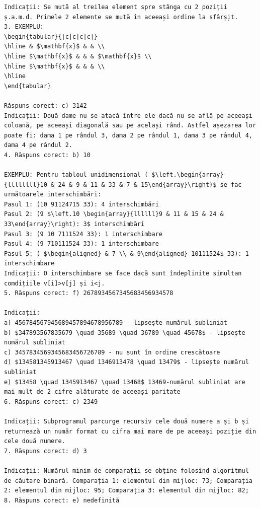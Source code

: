 \documentclass[10pt]{article}
\begin{document}
\begin{verbatim}
Indicații: Se mută al treilea element spre stânga cu 2 poziții ș.a.m.d. Primele 2 elemente se mută în aceeași ordine la sfârș̦it.
3. EXEMPLU:
\begin{tabular}{|c|c|c|c|}
\hline & $\mathbf{x}$ & & \\
\hline $\mathbf{x}$ & & & $\mathbf{x}$ \\
\hline $\mathbf{x}$ & & & \\
\hline
\end{tabular}

Răspuns corect: c) 3142
Indicații: Două dame nu se atacă între ele dacă nu se află pe aceeași coloană, pe aceeași diagonală sau pe același rând. Astfel așezarea lor poate fi: dama 1 pe rândul 3, dama 2 pe rândul 1, dama 3 pe rândul 4, dama 4 pe rândul 2.
4. Răspuns corect: b) 10

EXEMPLU: Pentru tabloul unidimensional ( $\left.\begin{array}{llllllll}10 & 24 & 9 & 11 & 33 & 7 & 15\end{array}\right)$ se fac următoarele interschimbări:
Pasul 1: (10 91124715 33): 4 interschimbări
Pasul 2: (9 $\left.10 \begin{array}{llllll}9 & 11 & 15 & 24 & 33\end{array}\right): 3$ interschimbări
Pasul 3: (9 10 7111524 33): 1 interschimbare
Pasul 4: (9 710111524 33): 1 interschimbare
Pasul 5: ( $\begin{aligned} & 7 \\ & 9\end{aligned} 10111524$ 33): 1 interschimbare
Indicații: O interschimbare se face dacă sunt îndeplinite simultan comdițiile v[i]>v[j] și i<j.
5. Răspuns corect: f) 2678934567345683456934578

Indicații:
a) 456784567945689457894678956789 - lipsește numărul subliniat
b) $347893567835679 \quad 35689 \quad 36789 \quad 45678$ - lipsește numărul subliniat
c) 3457834569345683456726789 - nu sunt în ordine crescătoare
d) $134581345913467 \quad 1346913478 \quad 13479$ - lipsește numărul subliniat
e) $13458 \quad 1345913467 \quad 13468$ 13469-numărul subliniat are mai mult de 2 cifre alăturate de aceeași paritate
6. Răspuns corect: c) 2349

Indicații: Subprogramul parcurge recursiv cele două numere a și b și returnează un număr format cu cifra mai mare de pe aceeași poziție din cele două numere.
7. Răspuns corect: d) 3

Indicații: Numărul minim de comparații se obține folosind algoritmul de căutare binară. Comparația 1: elementul din mijloc: 73; Comparația 2: elementul din mijloc: 95; Comparația 3: elementul din mijloc: 82;
8. Răspuns corect: e) nedefinită


\end{verbatim}
\end{document}
